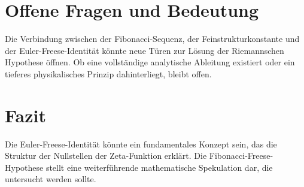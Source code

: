 \documentclass[a4paper,12pt]{article}
\begin{document}
\section{Offene Fragen und Bedeutung}
Die Verbindung zwischen der Fibonacci-Sequenz, der Feinstrukturkonstante und der Euler-Freese-Identität könnte neue Türen zur Lösung der Riemannschen Hypothese öffnen. Ob eine vollständige analytische Ableitung existiert oder ein tieferes physikalisches Prinzip dahinterliegt, bleibt offen.

\section{Fazit}
Die Euler-Freese-Identität könnte ein fundamentales Konzept sein, das die Struktur der Nullstellen der Zeta-Funktion erklärt. Die Fibonacci-Freese-Hypothese stellt eine weiterführende mathematische Spekulation dar, die untersucht werden sollte.
\end{document}
